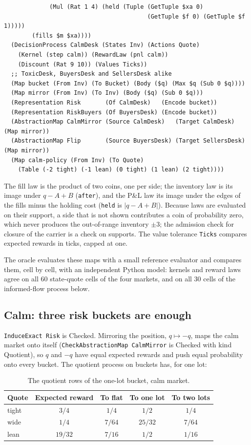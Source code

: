\documentclass[11pt]{article}
\newcommand{\code}[1]{\texttt{#1}}
\theoremstyle{definition}
\theoremstyle{plain}
\begin{document}
\begin{lstlisting}
             (Mul (Rat 1 4) (held (Tuple (GetTuple $xa 0)
                                         (GetTuple $f 0) (GetTuple $f 1)))))
        (fills $m $xa))))
  (DecisionProcess CalmDesk (States Inv) (Actions Quote)
    (Kernel (step calm)) (RewardLaw (pnl calm))
    (Discount (Rat 9 10)) (Values Ticks))
  ;; ToxicDesk, BuyersDesk and SellersDesk alike
  (Map bucket (From Inv) (To Bucket) (Body ($q) (Max $q (Sub 0 $q))))
  (Map mirror (From Inv) (To Inv) (Body ($q) (Sub 0 $q)))
  (Representation Risk       (Of CalmDesk)   (Encode bucket))
  (Representation RiskBuyers (Of BuyersDesk) (Encode bucket))
  (AbstractionMap CalmMirror (Source CalmDesk)   (Target CalmDesk)    (Map mirror))
  (AbstractionMap Flip       (Source BuyersDesk) (Target SellersDesk) (Map mirror))
  (Map calm-policy (From Inv) (To Quote)
    (Table (-2 tight) (-1 lean) (0 tight) (1 lean) (2 tight))))
\end{lstlisting}
The fill law is the product of two coins, one per side; the inventory law is its image under
$q-A+B$ (\code{after}), and the P\&L law its image under the edges of the fills minus the holding
cost (\code{held} is $|q-A+B|$). Because laws are evaluated on their support, a side that is not shown
contributes a coin of probability zero, which never produces the out-of-range inventory $\pm3$; the
admission check for closure of the carrier is a check on supports. The value tolerance \code{Ticks}
compares expected rewards in ticks, capped at one.

The oracle evaluates these maps with a small reference evaluator and compares them, cell by cell,
with an independent Python model: kernels and reward laws agree on all $60$ state-quote cells of the
four markets, and on all $30$ cells of the informed-flow process below.

\subsection{Calm: three risk buckets are enough}

\code{InduceExact Risk} is Checked. Mirroring the position, $q\mapsto-q$, maps the calm market onto
itself (\code{CheckAbstractionMap CalmMirror} is Checked with kind Quotient), so $q$ and $-q$ have equal
expected rewards and push equal probability onto every bucket. The quotient process on buckets has,
for one lot:

\begin{table}[ht]
\centering\small
\begin{tabular}{lcccc}
\toprule
Quote & Expected reward & To flat & To one lot & To two lots\\
\midrule
tight & $3/4$ & $1/4$ & $1/2$ & $1/4$\\
wide & $1/4$ & $7/64$ & $25/32$ & $7/64$\\
lean & $19/32$ & $7/16$ & $1/2$ & $1/16$\\
\bottomrule
\end{tabular}
\caption{The quotient rows of the one-lot bucket, calm market.}\label{tab:ex4quot}
\end{table}
\end{document}

